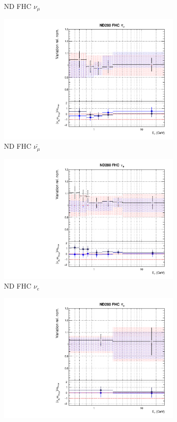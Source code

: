 \begin{figure}[t]
\begin{subfigure}{0.45\textwidth}
  \caption{ND FHC $\nu_{\mu}$}
\end{subfigure}
\begin{subfigure}{0.45\textwidth}
  \centering
  \includegraphics[width=0.75\linewidth]{figs/rhcmpdat28flux_1}
  \caption{ND FHC $\bar{\nu_{\mu}}$}
\end{subfigure}
\begin{subfigure}{0.45\textwidth}
  \centering
  \includegraphics[width=0.75\linewidth]{figs/rhcmpdat28flux_2}
  \caption{ND FHC $\nu_e$}
\end{subfigure}
\begin{subfigure}{0.45\textwidth}
  \centering
  \includegraphics[width=0.75\linewidth]{figs/rhcmpdat28flux_3}

\end{subfigure}
\end{figure}
